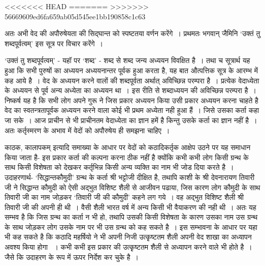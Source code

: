 \begin{myquote}
<<<<<<< HEAD
\hfill {}
=======
\hfill {}
>>>>>>> 56669609ed6fa659ab05d545ee1bb190858c1c63
\end{myquote}

अतः अभी वेद की अपौरुषेयता की सिद्घान्त को स्पष्टतया वर्णन करेंगे~। प्रथमतः भगवान् जैमिनि ‘उक्तं तु शब्दपूर्वत्वम्' इस सूत्र पर विचार करेंगे~।

‘उक्तं तु शब्दपूर्वत्वम्' - यहॉ पर ‘शब्द' - शब्द से शब्द जन्य अध्ययन विवक्षित है~। तथा च सूत्रार्थ यह हुआ कि सभी पुरुषों का अध्ययन अध्ययनान्तर पूर्वक हुआ करता है, यह बात औत्पत्तिक सूत्र के आरम्भ में कह आये है~। वेद के अध्ययन करने वालों की शब्दपूर्वता अर्थात् अविच्छिन्न परम्परा है~। प्रत्येक वेदाध्येता के अध्ययन से पूर्व अन्य अध्येता का अध्ययन था~। इस रीति से शब्दाध्ययन की अविच्छिन्न परम्परा है~। निष्कर्ष यह है कि सभी लोग अपने गुरू ने जिस प्रकार अध्ययन किया उसी प्रकार अध्ययन करना चाहते है वेद का स्वतन्त्रतापूर्वक अध्ययन करने वाला कोई भी प्रथम अध्येता नही हुआ हैं~। जिसे उसका कर्ता कहा जा सके~। आज प्राचीन से भी प्राचीनतम वेदाध्येता का ज्ञान हमें है किन्तु उसके कर्ता का ज्ञान नहीं है~। अतः कर्तृस्मरण के अभाव में वेदों को अपौरुषेय ही समझना चाहिए~।

काठक, कालापकम् इत्यादि समाख्या के आधार पर वेदों को कठादिकर्तृक आक्षेप उठने पर यह समाधान किया जाता है- इस प्रकार कर्ता की कल्पना करना ठीक नहीं है क्योंकि कभी कभी लोग किसी ग्रन्थ के साथ किसी विशेषता को देखकर कर्तृभिन्न किसी अन्य व्यक्ति का नाम भी जोड दिया करते है~। उदाहरणार्थ- ‘सिद्धान्तकौमुदी' ग्रन्थ के कर्ता श्री भट्टोजी दीक्षित है, तथापि काशी के श्री देवनारायण तिवारी जी ने सिद्धान्त कौमुदी को ऐसी अद्भुत विशिष्ट शैली से आजीवन पढाया, जिस कारण लोग कौमुदी के साथ तिवारी जी का नाम जोड़कर ‘तिवारी जी की कौमुदी' कहने लग गये~। वह अद्भुत विशिष्ट शैली श्री तिवारी जी की अपनी ही थी~। वैसी शैली भारत वर्ष में अन्य किसी भी वैयाकरण की नही थी~। अतः यह सम्भव है कि जिस ग्रन्थ का कर्ता न भी हो, तथापि उसकी किसी विशेषता के कारण उसका नाम उस ग्रन्थ के साथ जोड़कर लोग उसके नाम पर भी उस ग्रन्थ को कह सकते है~। इस सम्भावना के आधार पर यहा भी कह सकते है कि कठादि महर्षियो ने भी अपनी निजी उत्कृृष्टतम शैली अपनी वेद शाखा का अध्यापन अवश्य किया होगा ~। कभी कभी इस प्रकार की उत्कृृष्टतम शैली से अध्यापन करने वाले भी होते है~। जैसे कि उदाहरण के रूप में ऊपर निर्देश कर चुके है~। 

